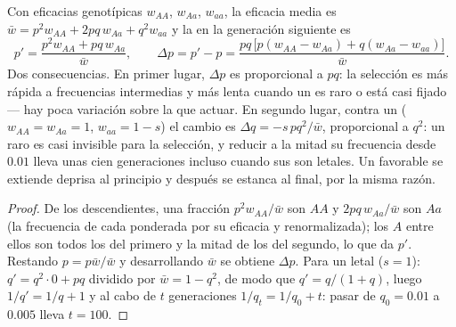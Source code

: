 \begin{theorem}\label{thm:b2:population-genetics:selection}
Con eficacias genotípicas $w_{AA}$, $w_{Aa}$, $w_{aa}$, la eficacia media
es $\bar w = p^{2}w_{AA} + 2pq\,w_{Aa} + q^{2}w_{aa}$ y la  en la generación siguiente es
\[
p' = \frac{p^{2}w_{AA} + pq\,w_{Aa}}{\bar w}, \qquad
\Delta p = p' - p = \frac{pq\,\bigl[p(w_{AA} - w_{Aa}) + q(w_{Aa} - w_{aa})\bigr]}{\bar w}.
\]
Dos consecuencias. En primer lugar, $\Delta p$ es proporcional a $pq$: la
selección es más rápida a frecuencias intermedias y más lenta cuando un
 es raro o está casi fijado --- hay poca variación sobre la que
actuar. En segundo lugar, contra un   ($w_{AA} = w_{Aa} = 1$, $w_{aa} =
1 - s$) el cambio es $\Delta q = -s\,pq^{2}/\bar w$, proporcional
a $q^{2}$: un  raro es casi invisible para la selección, y reducir
a la mitad su frecuencia desde $0.01$ lleva unas cien generaciones
incluso cuando sus  son letales. Un   favorable
se extiende deprisa al principio y después se estanca al final, por la
misma razón.
\end{theorem}
\begin{proof}
De los descendientes, una fracción $p^{2}w_{AA}/\bar w$ son $AA$ y
$2pq\,w_{Aa}/\bar w$ son $Aa$ (la frecuencia de cada  ponderada
por su eficacia y renormalizada); los  $A$ entre ellos son todos los
del primero y la mitad de los del segundo, lo que da $p'$. Restando $p =
p\bar w/\bar w$ y desarrollando $\bar w$ se obtiene $\Delta p$. Para un
 letal ($s = 1$): $q' = q^{2}\cdot 0 + pq$ dividido por $\bar w = 1 -
q^{2}$, de modo que $q' = q/(1 + q)$, luego $1/q' = 1/q + 1$ y al cabo de $t$
generaciones $1/q_t = 1/q_0 + t$: pasar de $q_0 = 0.01$ a $0.005$ lleva
$t = 100$.
\end{proof}

